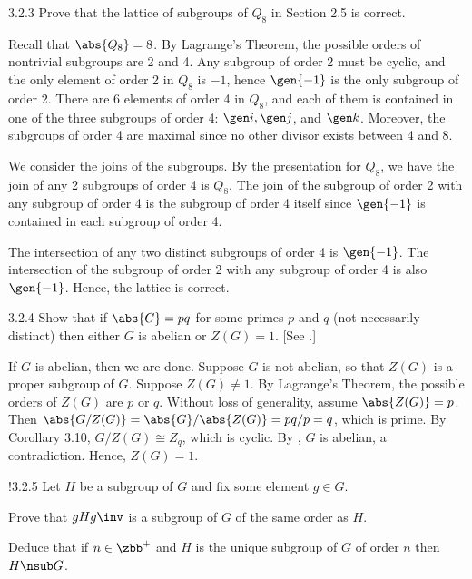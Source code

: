 \begin{exercise}{3.2.3}
    Prove that the lattice of subgroups of $Q_8$ in Section 2.5 is correct.
\end{exercise}

\begin{sol}
    Recall that $\abs{Q_8} = 8$.
	By Lagrange's Theorem, the possible orders of nontrivial subgroups are 2 and 4.
	Any subgroup of order 2 must be cyclic, and the only element of order 2 in $Q_8$ is $-1$, hence $\gen{-1}$ is the only subgroup of order 2.
	There are 6 elements of order 4 in $Q_8$, and each of them is contained in one of the three subgroups of order 4: $\gen i, \gen j$, and $\gen k$.
	Moreover, the subgroups of order 4 are maximal since no other divisor exists between 4 and 8.

    We consider the joins of the subgroups.
	By the presentation for $Q_8$, we have the join of any 2 subgroups of order 4 is $Q_8$.
	The join of the subgroup of order 2 with any subgroup of order 4 is the subgroup of order 4 itself since $\gen{-1}$ is contained in each subgroup of order 4.

    The intersection of any two distinct subgroups of order 4 is $\gen{-1}$.
	The intersection of the subgroup of order 2 with any subgroup of order 4 is also $\gen{-1}$.
	Hence, the lattice is correct.
\end{sol}

\begin{exercise}{3.2.4}
    Show that if $\abs{G} = pq$ for some primes $p$ and $q$ (not necessarily distinct) then either $G$ is abelian or $Z(G) = 1$. [See .]
\end{exercise}

\begin{sol}
    If $G$ is abelian, then we are done.
	Suppose $G$ is not abelian, so that $Z(G)$ is a proper subgroup of $G$.
	Suppose $Z(G) \neq 1$.
	By Lagrange's Theorem, the possible orders of $Z(G)$ are $p$ or $q$.
	Without loss of generality, assume $\abs{Z(G)} = p$.
	Then $\abs{G/Z(G)} = \abs{G}/\abs{Z(G)} = pq/p = q$, which is prime.
	By Corollary 3.10, $G/Z(G) \cong Z_q$, which is cyclic.
	By , $G$ is abelian, a contradiction.
	Hence, $Z(G) = 1$.
\end{sol}

\begin{exercise}!{3.2.5}
    Let $H$ be a subgroup of $G$ and fix some element $g \in G$. 
    \begin{subexercises}
        \item Prove that $gH g\inv$ is a subgroup of $G$ of the same order as $H$.
        \item Deduce that if $n \in \zbb^+$ and $H$ is the unique subgroup of $G$ of order $n$ then $H \nsub G$.
    \end{subexercises}
\end{exercise}


